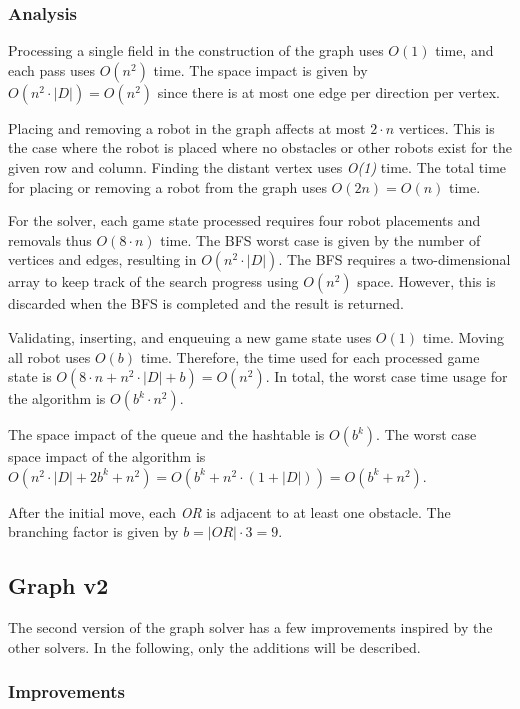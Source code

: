 \documentclass[]{article}
\begin{document}
\subsubsection{Analysis}\label{analysis-1}

Processing a single field in the construction of the graph uses \(O(1)\)
time, and each pass uses \(O(n^2)\) time. The space impact is given by
\(O(n^2 \cdot |D|) = O(n^2)\) since there is at most one edge per
direction per vertex.

Placing and removing a robot in the graph affects at most \(2 \cdot n\)
vertices. This is the case where the robot is placed where no obstacles
or other robots exist for the given row and column. Finding the distant
vertex uses \emph{O(1)} time. The total time for placing or removing a
robot from the graph uses \(O(2n) = O(n)\) time.

For the solver, each game state processed requires four robot placements
and removals thus \(O(8 \cdot n)\) time. The BFS worst case is given by
the number of vertices and edges, resulting in \(O(n^2 \cdot |D|)\). The
BFS requires a two-dimensional array to keep track of the search
progress using \(O(n^2)\) space. However, this is discarded when the BFS
is completed and the result is returned.

Validating, inserting, and enqueuing a new game state uses \(O(1)\)
time. Moving all robot uses \(O(b)\) time. Therefore, the time used for
each processed game state is
\(O(8 \cdot n + n^2 \cdot |D| + b) = O(n^2)\). In total, the worst case
time usage for the algorithm is \(O(b^k \cdot n^2)\).

The space impact of the queue and the hashtable is \(O(b^k)\). The worst
case space impact of the algorithm is
\(O(n^2 \cdot |D| + 2b^k + n^2) = O(b^k + n^2 \cdot (1 + |D|)) = O(b^k + n^2)\).

After the initial move, each \emph{OR} is adjacent to at least one
obstacle. The branching factor is given by \(b = |OR| \cdot 3 = 9\).

\subsection{Graph v2}\label{graph-v2}

The second version of the graph solver has a few improvements inspired
by the other solvers. In the following, only the additions will be
described.

\subsubsection{Improvements}\label{improvements}
\end{document}
